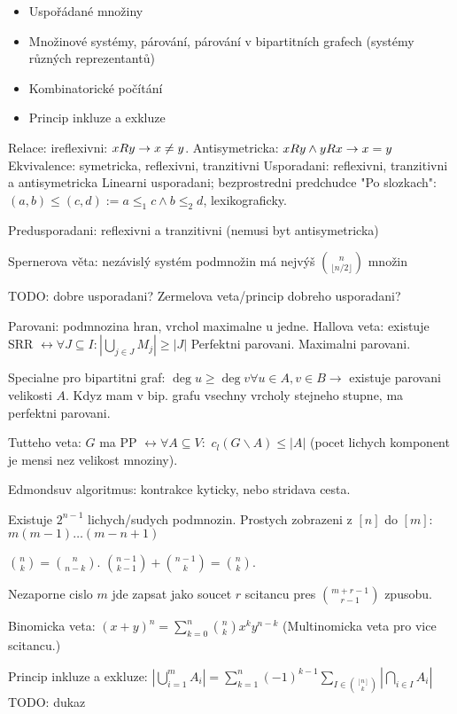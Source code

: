 \begin{itemize}
\item Uspořádané množiny
\item Množinové systémy, párování, párování v bipartitních grafech (systémy
různých reprezentantů)
\item Kombinatorické počítání
\item Princip inkluze a exkluze
\end{itemize}

Relace: ireflexivni: $xRy\rightarrow x\neq y$. Antisymetricka: $xRy\wedge yRx\rightarrow x=y$
Ekvivalence: symetricka, reflexivni, tranzitivni
Usporadani: reflexivni, tranzitivni a antisymetricka
Linearni usporadani; bezprostredni predchudce
"Po slozkach": $(a,b)\leq(c,d):=a\leq_1 c \wedge b\leq_2 d$,
lexikograficky.

Predusporadani: reflexivni a tranzitivni (nemusi byt antisymetricka)

Spernerova věta: nezávislý systém podmnožin má nejvýš $\binom{n}{\lfloor
n/2\rfloor}$ množin

TODO: dobre usporadani? Zermelova veta/princip dobreho usporadani?

Parovani: podmnozina hran, vrchol maximalne u jedne.
Hallova veta: existuje SRR $\leftrightarrow \forall J\subseteq I:
|\bigcup_{j\in J}M_j|\geq |J|$
Perfektni parovani. Maximalni parovani.

Specialne pro bipartitni graf: $\deg u\geq\deg v\forall u\in A,v\in
B\rightarrow$ existuje parovani velikosti $A$. Kdyz mam v bip. grafu
vsechny vrcholy stejneho stupne, ma perfektni parovani.

Tutteho veta: $G$ ma PP $\leftrightarrow \forall A\subseteq V:$
$c_l(G\smallsetminus A)\leq |A|$ (pocet lichych komponent je mensi nez velikost
mnoziny).

Edmondsuv algoritmus: kontrakce kyticky, nebo stridava cesta.

Existuje $2^{n-1}$ lichych/sudych podmnozin.
Prostych zobrazeni z $[n]$ do $[m]$: $m(m-1)\ldots (m-n+1)$

$\binom{n}{k}=\binom{n}{n-k}$. $\binom{n-1}{k-1}+\binom{n-1}{k}=\binom{n}{k}$.

Nezaporne cislo $m$ jde zapsat jako soucet $r$ scitancu pres
$\binom{m+r-1}{r-1}$ zpusobu.

Binomicka veta: $(x+y)^n=\sum_{k=0}^n\binom{n}{k}x^k y^{n-k}$
(Multinomicka veta pro vice scitancu.)

Princip inkluze a exkluze:
$\left|\bigcup_{i=1}^m A_i\right|=\sum_{k=1}^n (-1)^{k-1}
\sum_{I\in\binom{[n]}{k}}|\bigcap_{i\in I}A_i|$
TODO: dukaz

